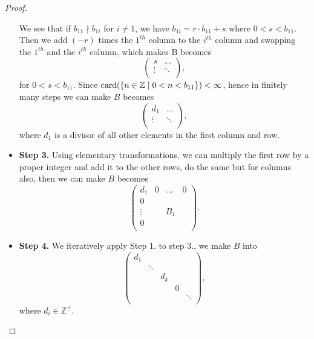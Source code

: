 \begin{proof}
\begin{itemize}
		      \par We see that if \(b_{11}\nmid b_{1i}\) for \(i \neq 1\), we have \(b_{1i} = r\cdot b_{11} + s\) where \(0 < s < b_{11}\). Then we add \((-r)\) times the
		      \(1^{th} \) column to the \(i^{th} \) column and swapping the \(1^{th} \) and the \(i^{th} \) column, which makes B becomes
		      \[
			      \begin{pmatrix}
				      s      & \dots  \\
				      \vdots & \ddots \\
			      \end{pmatrix},
		      \]
		      for \(0 < s< b_{11} \). Since \(\operatorname{card}(\left\{n\in \mathbb{Z} \mid 0 < n <b_{11} \right\}) < \infty \), hence in finitely many steps we can make
		      \(B\) becomes
		      \[
			      \begin{pmatrix}
				      d_1    & \dots  \\
				      \vdots & \ddots \\
			      \end{pmatrix},
		      \]
		      where \(d_1\) is a divisor of all other elements in the first column and row.
		\item \textbf{Step 3.} Using elementary transformations, we can multiply the first row by a proper integer and add it to the other rows, do the same but for columns also, then we can
		      make \(B\) becomes
		      \[
			      \begin{pmatrix}
				      d_1    & 0 & \dots & 0 \\
				      0      &   &       &   \\
				      \vdots &   & B_1   &   \\
				      0      &   &       &   \\
			      \end{pmatrix}.
		      \]
		\item \textbf{Step 4.} We iteratively apply Step 1. to step 3., we make \(B\) into
		      \[
			      \begin{pmatrix}
				      d_1 &        &       &   &        \\
				          & \ddots &       &   &        \\
				          &        & d_{k} &   &        \\
				          &        &       & 0 &        \\
				          &        &       &   & \ddots \\
			      \end{pmatrix},
		      \]
		      where \(d_{i} \in \mathbb{Z} ^+\).

\end{itemize}
\end{proof}
